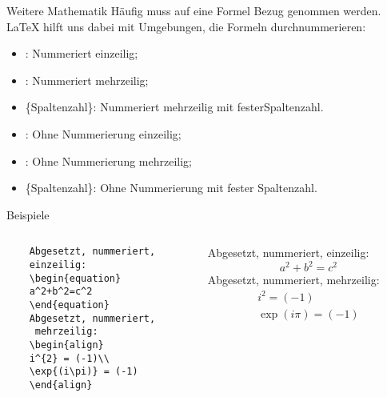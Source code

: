 \begin{frame}[fragile]{Weitere Mathematik}
Häufig muss auf eine Formel Bezug genommen werden. \LaTeX{} hilft uns dabei mit Umgebungen, die Formeln durchnummerieren:

\pause
\begin{itemize}
\item {}: Nummeriert einzeilig;\pause
\item {}: Nummeriert mehrzeilig;\pause
\item {}\textrm{\{\textlangle Spaltenzahl\textrangle\}}: Nummeriert mehrzeilig mit festerSpaltenzahl.\pause
\item {}: Ohne Nummerierung einzeilig;
\item {}: Ohne Nummerierung mehrzeilig;
\item {}\textrm{\{\textlangle Spaltenzahl\textrangle\}}: Ohne Nummerierung mit fester Spaltenzahl.
\end{itemize}
\end{frame}

\begin{frame}[fragile]{Beispiele}
\begin{columns}
\begin{column}{.48\textwidth}\footnotesize
\begin{codeblock}
\begin{verbatim}
	Abgesetzt, nummeriert, 
	einzeilig:
    \begin{equation}
    a^2+b^2=c^2
    \end{equation}
    Abgesetzt, nummeriert,
     mehrzeilig:
    \begin{align}
    i^{2} = (-1)\\
    \exp{(i\pi)} = (-1) 
    \end{align}
\end{verbatim}
\end{codeblock}
\end{column}
%
\begin{column}{.45\textwidth}	\pause	
	Abgesetzt, nummeriert, einzeilig:
    \begin{equation}
    a^2+b^2=c^2
    \end{equation}\pause
    Abgesetzt, nummeriert, mehrzeilig:
    \begin{align}
    i^{2} = (-1)\\
    \exp{(i\pi)} = (-1) 
    \end{align}
\end{column}
\end{columns}
\end{frame}